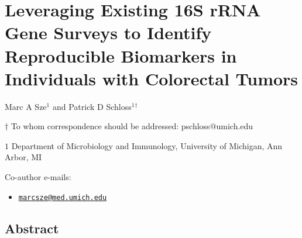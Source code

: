\documentclass[12pt,]{article}
\title{}
\author{}
\date{}
\providecommand{\tightlist}{%
  \setlength{\itemsep}{0pt}\setlength{\parskip}{0pt}}
\begin{document}
\section{Leveraging Existing 16S rRNA Gene Surveys to Identify
Reproducible Biomarkers in Individuals with Colorectal
Tumors}\label{leveraging-existing-16s-rrna-gene-surveys-to-identify-reproducible-biomarkers-in-individuals-with-colorectal-tumors}

\begin{center}
\vspace{25mm}

Marc A Sze${^1}$ and Patrick D Schloss${^1}$${^\dagger}$

\vspace{20mm}

$\dagger$ To whom correspondence should be addressed: pschloss@umich.edu

$1$ Department of Microbiology and Immunology, University of Michigan, Ann Arbor, MI




\end{center}

Co-author e-mails:

\begin{itemize}
\tightlist
\item
  \href{mailto:marcsze@med.umich.edu}{\nolinkurl{marcsze@med.umich.edu}}
\end{itemize}

\newpage

\linenumbers

\subsection{Abstract}\label{abstract}
\end{document}
